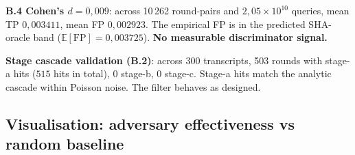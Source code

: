 \documentclass[11pt,a4paper]{article}
\begin{document}
\textbf{B.4 Cohen's $d = 0{,}009$}: across 10\,262 round-pairs and $2{,}05 \times 10^{10}$ queries, mean TP $0{,}003411$, mean FP $0{,}002923$. The empirical FP is in the predicted SHA-oracle band ($\mathbb{E}[\text{FP}] = 0{,}003725$). \textbf{No measurable discriminator signal.}

\textbf{Stage cascade validation (B.2)}: across 300 transcripts, 503 rounds with stage-a hits ($515$ hits in total), $0$ stage-b, $0$ stage-c. Stage-a hits match the analytic cascade within Poisson noise. The filter behaves as designed.

\subsection{Visualisation: adversary effectiveness vs random baseline}
\end{document}
